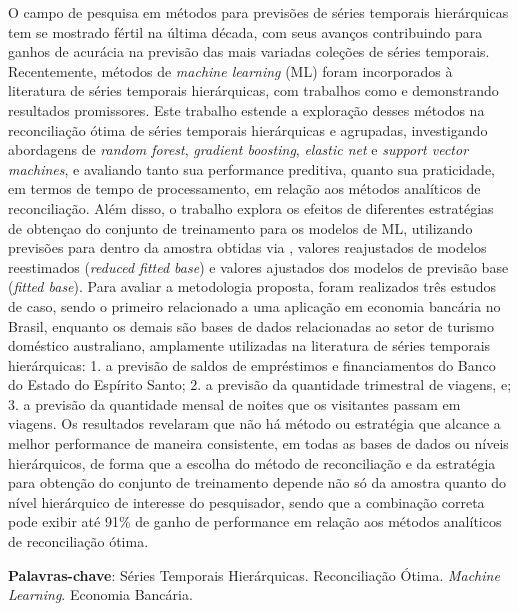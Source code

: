 

\setlength{\absparsep}{18pt}
\begin{resumo}
  O campo de pesquisa em métodos para previsões de séries temporais hierárquicas tem se mostrado fértil na última década, com seus avanços contribuindo para ganhos de acurácia na previsão das mais variadas coleções de séries temporais. Recentemente, métodos de \textit{machine learning} (ML) foram incorporados à literatura de séries temporais hierárquicas, com trabalhos como \textcite{spiliotis_hierarchical_2021} e \textcite{makridakis_m5_2022} demonstrando resultados promissores. Este trabalho estende a exploração desses métodos na reconciliação ótima de séries temporais hierárquicas e agrupadas, investigando abordagens de \textit{random forest}, \textit{gradient boosting}, \textit{elastic net} e \textit{support vector machines}, e avaliando tanto sua performance preditiva, quanto sua praticidade, em termos de tempo de processamento, em relação aos métodos analíticos de reconciliação. Além disso, o trabalho explora os efeitos de diferentes estratégias de obtençao do conjunto de treinamento para os modelos de ML, utilizando previsões para dentro da amostra obtidas via \textcite{rolling origin forecasting}, valores reajustados de modelos reestimados (\textit{reduced fitted base}) e valores ajustados dos modelos de previsão base (\textit{fitted base}). Para avaliar a metodologia proposta, foram realizados três estudos de caso, sendo o primeiro relacionado a uma aplicação em economia bancária no Brasil, enquanto os demais são bases de dados relacionadas ao setor de turismo doméstico australiano, amplamente utilizadas na literatura de séries temporais hierárquicas: 1. a previsão de saldos de empréstimos e financiamentos do Banco do Estado do Espírito Santo; 2. a previsão da quantidade trimestral de viagens, e; 3. a previsão da quantidade mensal de noites que os visitantes passam em viagens. Os resultados revelaram que não há método ou estratégia que alcance a melhor performance de maneira consistente, em todas as bases de dados ou níveis hierárquicos, de forma que a escolha do método de reconciliação e da estratégia para obtenção do conjunto de treinamento depende não só da amostra quanto do nível hierárquico de interesse do pesquisador, sendo que a combinação correta pode exibir até 91\% de ganho de performance em relação aos métodos analíticos de reconciliação ótima.

  \textbf{Palavras-chave}: Séries Temporais Hierárquicas. Reconciliação Ótima. \textit{Machine Learning}. Economia Bancária.
\end{resumo}

